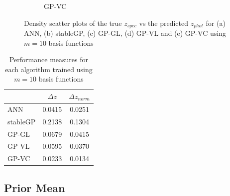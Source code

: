 \documentclass[useAMS,usenatbib,fleqn]{mn2e}
\begin{document}
\begin{figure}
\begin{subfigure}[b]{0.45\columnwidth}
                \caption{GP-VC}
        \end{subfigure}
        
        \caption{Density scatter plots of the true $z_{spec}$ vs the predicted $z_{phot}$ for (a) ANN, (b) stableGP, (c) GP-GL, (d) GP-VL and (e) GP-VC using $m=10$ basis functions}
        \label{fig-experiment-1}
\end{figure}

 \begin{table}
\caption{Performance measures for each algorithm trained using $m=10$ basis functions}
\begin{center}
  \begin{tabular}{| l | c | c | }
     				&	$\Delta z$	&	$\Delta z_{norm}$	\\	\hline
	ANN		&	0.0415		&	0.0251				\\	 
	stableGP	&	0.2138		&	0.1304				\\ 
	GP-GL		&	0.0679		&	0.0415				\\
	GP-VL		&	0.0595		&	0.0370				\\
	GP-VC		&	0.0233		&	0.0134				\\	\hline
  \end{tabular}
  \label{table-experiment-1}
\end{center}
\end{table}

\subsection{Prior Mean}
\end{document}
